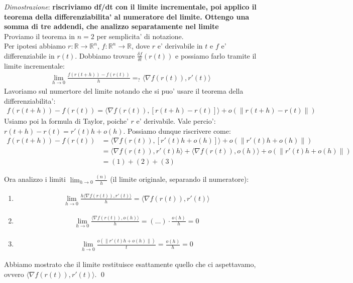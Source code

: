 \documentclass{article}
\begin{document}
\emph{Dimostrazione}: \textbf{riscriviamo df/dt con il limite incrementale, poi
applico il teorema della differenziabilita' al numeratore del limite. Ottengo
una somma di tre addendi, che analizzo separatamente nel limite} \\
Proviamo il teorema in $n = 2$ per semplicita' di notazione. \\
Per ipotesi abbiamo $r: \mathbb{R} \to \mathbb{R}^n$, $f: \mathbb{R}^n \to \mathbb{R}$,
dove $r$ e' derivabile in $t$ e $f$ e' differenziabile in $r(t)$. Dobbiamo
trovare $\frac{\delta f}{\delta t} (r(t))$ e possiamo farlo tramite il limite incrementale:
\begin{align*}
  \lim_{h \to 0} \frac{f(r(t + h)) - f(r(t))}{h} =_? \langle \nabla f(r(t)), r'(t) \rangle
\end{align*}
Lavoriamo sul numertore del limite notando che si puo' usare il teorema della differenziabilita':
\begin{align*}
  f(r(t + h)) - f(r(t)) = \langle \nabla f(r(t)), [r(t+h) - r(t)] \rangle
  + o(\|r(t+h) - r(t)\|)
\end{align*}
Usiamo poi la formula di Taylor, poiche' $r$ e' derivabile. Vale percio': $r(t + h) - r(t) = r'(t)h + o(h)$.
Possiamo dunque riscrivere come:
\begin{align*}
  f(r(t + h)) - f(r(t)) &= \langle \nabla f(r(t)), [r'(t)h + o(h)] \rangle
  + o(\|r'(t)h + o(h)\|) \\
                        &= \langle \nabla f(r(t)), r'(t)h \rangle + \langle
                        \nabla f(r(t)), o(h) \rangle + o(\|r'(t)h + o(h)\|) \\
                        &= (1) + (2) + (3)
\end{align*}

\noindent Ora analizzo i limiti $\lim_{h \to 0} \frac{(n)}{h}$ (il limite originale, separando il numeratore):
\begin{enumerate}
  \item \begin{align*}
      \lim_{h \to 0} \frac{h \langle \nabla f(r(t)), r'(t)\rangle}{h} = \langle \nabla f(r(t)), r'(t) \rangle
  \end{align*}
  \item \begin{align*}
      \lim_{h \to 0} \frac{\langle \nabla f(r(t)), o(h) \rangle}{h} = (\ldots) \cdot \frac{o(h)}{h} = 0
  \end{align*}
  \item \begin{align*}
      \lim_{h \to 0} \frac{o(\|r'(t)h + o(h)\|)}{t} = \frac{o(h)}{h} = 0
  \end{align*}
\end{enumerate}
Abbiamo mostrato che il limite restituisce esattamente quello che ci aspettavamo,
ovvero $\langle \nabla f(r(t)), r'(t) \rangle$.
\qed
\end{document}
